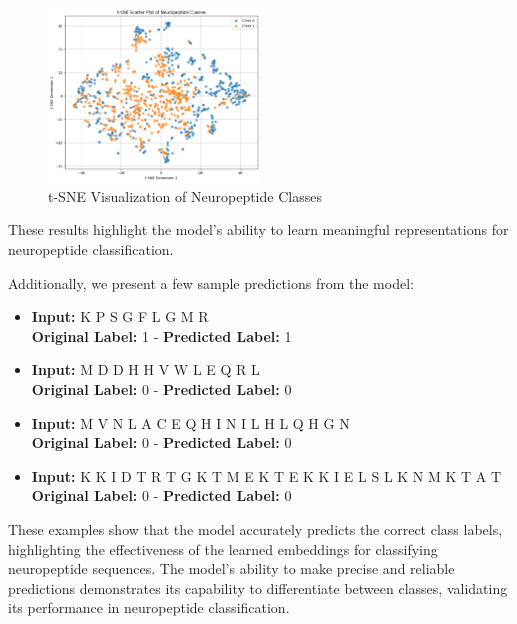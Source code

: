 \documentclass[conference]{IEEEtran}
\begin{document}
\begin{figure}[h]
\centering
\includegraphics[width=0.5\textwidth]{Images/10.png}
\vspace{-.6em}
\caption{t-SNE Visualization of Neuropeptide Classes}
\label{fig:tsne_plot}
\end{figure}
\vspace{-.6em}
These results highlight the model's ability to learn meaningful representations for neuropeptide classification.

Additionally, we present a few sample predictions from the model:

\begin{itemize}
    \vspace{.3em}
    \item \textbf{Input:} K P S G F L G M R \\
    \textbf{Original Label:} 1 - \textbf{Predicted Label:} 1
    \item \textbf{Input:} M D D H H V W L E Q R L \\
    \textbf{Original Label:} 0 - \textbf{Predicted Label:} 0
    \item \textbf{Input:} M V N L A C E Q H I N I L H L Q H G N \\
    \textbf{Original Label:} 0 - \textbf{Predicted Label:} 0
    \item \textbf{Input:} K K I D T R T G K T M E K T E K K I E L S L K N M K T A T \\
    \textbf{Original Label:} 0 - \textbf{Predicted Label:} 0
    \vspace{.3em}
\end{itemize}

These examples show that the model accurately predicts the correct class labels, highlighting the effectiveness of the learned embeddings for classifying neuropeptide sequences. The model's ability to make precise and reliable predictions demonstrates its capability to differentiate between classes, validating its performance in neuropeptide classification.
\end{document}
